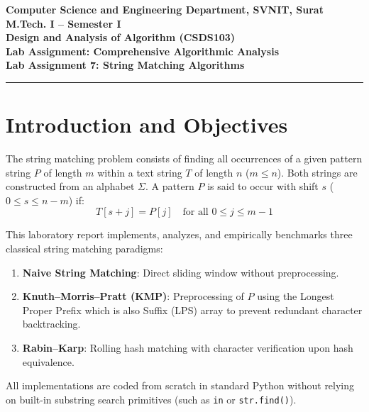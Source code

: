 \documentclass[12pt]{article}
\begin{document}

\begin{center}
\textbf{Computer Science and Engineering Department, SVNIT, Surat}\\
\textbf{M.Tech. I -- Semester I}\\
\textbf{Design and Analysis of Algorithm (CSDS103)}\\
\textbf{Lab Assignment: Comprehensive Algorithmic Analysis}\\
\textbf{Lab Assignment 7: String Matching Algorithms}
\end{center}
\vspace{-4pt}
\hrule
\vspace{4pt}

\vspace{0.3cm}

\section{Introduction and Objectives}
The string matching problem consists of finding all occurrences of a given pattern string $P$ of length $m$ within a text string $T$ of length $n$ ($m \le n$). Both strings are constructed from an alphabet $\Sigma$. A pattern $P$ is said to occur with shift $s$ ($0 \le s \le n - m$) if:
\begin{equation}
T[s + j] = P[j] \quad \text{for all } 0 \le j \le m - 1
\end{equation}

This laboratory report implements, analyzes, and empirically benchmarks three classical string matching paradigms:
\begin{enumerate}
    \item \textbf{Naive String Matching}: Direct sliding window without preprocessing.
    \item \textbf{Knuth--Morris--Pratt (KMP)}: Preprocessing of $P$ using the Longest Proper Prefix which is also Suffix (LPS) array to prevent redundant character backtracking.
    \item \textbf{Rabin--Karp}: Rolling hash matching with character verification upon hash equivalence.
\end{enumerate}

All implementations are coded from scratch in standard Python without relying on built-in substring search primitives (such as \texttt{in} or \texttt{str.find()}).
\end{document}
